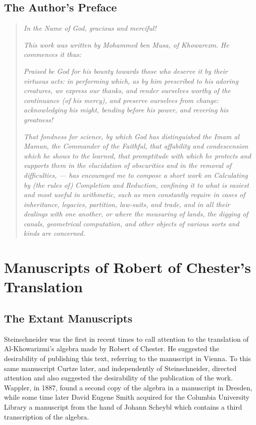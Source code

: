 \documentclass[11pt,a4paper]{book}
\begin{document}
\section*{The Author's Preface}

\begin{quote}
\textit{In the Name of God, gracious and merciful!}

\textit{This work was written by Mohammed ben Musa, of Khowarezm. He commences it thus:}

\textit{Praised be God for his bounty towards those who deserve it by their virtuous acts: in performing which, as by him prescribed to his adoring creatures, we express our thanks, and render ourselves worthy of the continuance (of his mercy), and preserve ourselves from change: acknowledging his might, bending before his power, and revering his greatness!}

\textit{That fondness for science, by which God has distinguished the Imam al Mamun, the Commander of the Faithful, that affability and condescension which he shows to the learned, that promptitude with which he protects and supports them in the elucidation of obscurities and in the removal of difficulties, --- has encouraged me to compose a short work on Calculating by (the rules of) Completion and Reduction, confining it to what is easiest and most useful in arithmetic, such as men constantly require in cases of inheritance, legacies, partition, law-suits, and trade, and in all their dealings with one another, or where the measuring of lands, the digging of canals, geometrical computation, and other objects of various sorts and kinds are concerned.}
\end{quote}

\chapter{Manuscripts of Robert of Chester's Translation}

\section{The Extant Manuscripts}

Steinschneider was the first in recent times to call attention to the translation of Al-Khowarizmi's algebra made by Robert of Chester. He suggested the desirability of publishing this text, referring to the manuscript in Vienna. To this same manuscript Curtze later, and independently of Steinschneider, directed attention and also suggested the desirability of the publication of the work. Wappler, in 1887, found a second copy of the algebra in a manuscript in Dresden, while some time later David Eugene Smith acquired for the Columbia University Library a manuscript from the hand of Johann Scheybl which contains a third transcription of the algebra.
\end{document}
